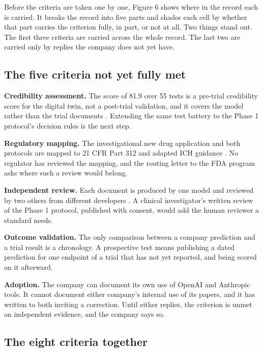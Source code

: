 Before the criteria are taken one by one, Figure 6 shows where in the record each
is carried. It breaks the record into five parts and shades each cell by whether
that part carries the criterion fully, in part, or not at all. Two things stand
out. The first three criteria are carried across the whole record. The last two
are carried only by replies the company does not yet have.

\subsection{The five criteria not yet fully met}

\textbf{Credibility assessment.} The score of 81.9 over 55 tests is a pre-trial
credibility score for the digital twin, not a post-trial validation, and it
covers the model rather than the trial documents \cite{daraxsims}. Extending the
same test battery to the Phase 1 protocol's decision rules is the next step.

\textbf{Regulatory mapping.} The investigational new drug application and both
protocols are mapped to 21 CFR Part 312 and adapted ICH guidance
\cite{phase1ind,ecfr2026part312}. No regulator has reviewed the mapping, and the
routing letter to the FDA program asks where such a review would belong.

\textbf{Independent review.} Each document is produced by one model and reviewed
by two others from different developers \cite{tripartisan2026}. A clinical
investigator's written review of the Phase 1 protocol, published with consent,
would add the human reviewer a standard needs.

\textbf{Outcome validation.} The only comparison between a company prediction
and a trial result is a chronology. A prospective test means publishing a dated
prediction for one endpoint of a trial that has not yet reported, and being
scored on it afterward.

\textbf{Adoption.} The company can document its own use of OpenAI and Anthropic
tools. It cannot document either company's internal use of its papers, and it
has written to both inviting a correction. Until either replies, the criterion
is unmet on independent evidence, and the company says so.

\subsection{The eight criteria together}

